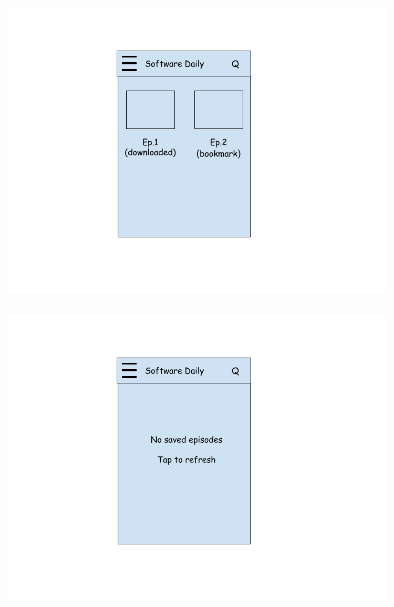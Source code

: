 \documentclass{article}
\begin{document}
\begin{figure}[h]
\centering
\begin{minipage}{.6\textwidth}
  \centering
  \includegraphics[width=10cm,height=8cm]{img/bookmarks.png}
\end{minipage}%
\begin{minipage}{.5\textwidth}
  \centering
  \includegraphics[width=10cm,height=8cm]{img/bookmarks_mockup.png}
\end{minipage}
\end{figure}
\end{document}
